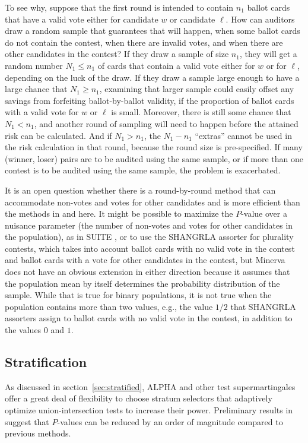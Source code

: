 \documentclass[aoas]{imsart}
\begin{document}
To see why, suppose that the first round is intended to contain $n_1$ ballot cards that have a valid vote either
for candidate $w$ or candidate $\ell$.  
How can auditors draw a random sample that guarantees that will happen, when some ballot cards do not contain
the contest, when there are invalid votes, and when there are other candidates in the contest?
If they draw a sample of size $n_1$, they will get a random number $N_1 \le n_1$ of cards that contain a valid vote either
for $w$ or for $\ell$, depending on the luck of the draw.
If they draw a sample large enough to have a large chance that $N_1 \ge n_1$, examining that larger sample could easily 
offset any savings from forfeiting ballot-by-ballot validity, if the proportion of ballot cards with a valid vote for $w$ or $\ell$ is
small.
Moreover, there is still some chance that $N_1 < n_1$, and another round of sampling will need to happen before the attained risk can be calculated.
And if $N_1 > n_1$, the $N_1-n_1$ ``extras'' cannot be used in the risk calculation in that round, because the round size is pre-specified.
If many (winner, loser) pairs are to be audited using the same sample, or if more than one contest is to be audited
using the same sample, the problem is exacerbated.

It is an open question whether there is a round-by-round method that can accommodate non-votes and votes
for other candidates and is more efficient than the methods in \citet{waudby-smithEtal21,stark20} and here.
It might be possible to maximize the $P$-value over a nuisance parameter (the number of non-votes and votes
for other candidates in the population), as in SUITE \citep{ottoboniEtal18}, or to use the SHANGRLA assorter
for plurality contests, which takes into account ballot cards with no valid vote in the contest and ballot cards with
a vote for other candidates in the contest, but Minerva does not have an obvious extension in either direction
because it assumes that the population mean by itself determines the probability distribution of
the sample.
While that is true for binary populations, it is not true when the population contains more than two values, e.g., the value $1/2$ that
SHANGRLA assorters assign to ballot cards with no valid vote in the contest, in addition to the values $0$ and $1$.

\subsection{Stratification}
As discussed in section~\ref{sec:stratified}, ALPHA and other test supermartingales offer a great deal of flexibility to
choose stratum selectors that
adaptively optimize union-intersection tests to increase their power.
Preliminary results in \cite{spertusStark22} suggest that $P$-values can be reduced by an order of magnitude
compared to previous methods.
\end{document}
